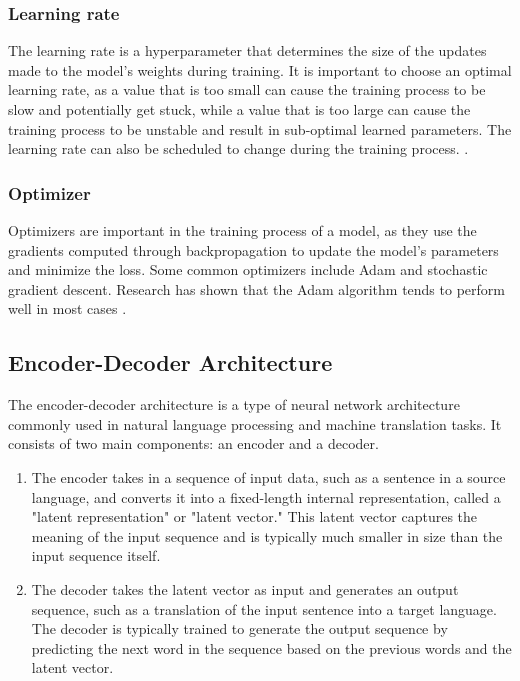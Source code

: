 \documentclass{book}
\begin{document}
	\subsubsection{Learning rate}
	
	The learning rate is a hyperparameter that determines the size of the updates made to the model's weights during training. It is important to choose an optimal learning rate, as a value that is too small can cause the training process to be slow and potentially get stuck, while a value that is too large can cause the training process to be unstable and result in sub-optimal learned parameters. The learning rate can also be scheduled to change during the training process. \cite{senior2013empirical}. 
	
	
	\subsubsection{Optimizer}
	
	Optimizers are important in the training process of a model, as they use the gradients computed through backpropagation to update the model's parameters and minimize the loss. Some common optimizers include Adam and stochastic gradient descent. Research has shown that the Adam algorithm tends to perform well in most cases \cite{zaheer2019study}.
	
	\subsection{Encoder-Decoder Architecture}
	The encoder-decoder architecture is a type of neural network architecture commonly used in natural language processing and machine translation tasks. It consists of two main components: an encoder and a decoder.
	\begin{enumerate}
		\item The encoder takes in a sequence of input data, such as a sentence in a source language, and converts it into a fixed-length internal representation, called a "latent representation" or "latent vector." This latent vector captures the meaning of the input sequence and is typically much smaller in size than the input sequence itself.
		\item The decoder takes the latent vector as input and generates an output sequence, such as a translation of the input sentence into a target language. The decoder is typically trained to generate the output sequence by predicting the next word in the sequence based on the previous words and the latent vector.
	\end{enumerate}
	
\end{document}

